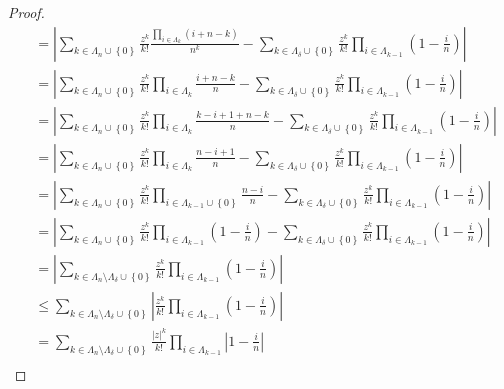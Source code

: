 \documentclass[dvipdfmx]{jsarticle}
\begin{document}
\begin{proof}
\begin{align*}
&= \left| \sum_{k \in \varLambda_{n} \cup \left\{ 0 \right\}} {\frac{z^{k}}{k!}\frac{\prod_{i \in \varLambda_{k}} (i + n - k)}{n^{k}}} - \sum_{k \in \varLambda_{\delta} \cup \left\{ 0 \right\}} {\frac{z^{k}}{k!}\prod_{i \in \varLambda_{k - 1}} \left( 1 - \frac{i}{n} \right)} \right|\\
&= \left| \sum_{k \in \varLambda_{n} \cup \left\{ 0 \right\}} {\frac{z^{k}}{k!}\prod_{i \in \varLambda_{k}} \frac{i + n - k}{n}} - \sum_{k \in \varLambda_{\delta} \cup \left\{ 0 \right\}} {\frac{z^{k}}{k!}\prod_{i \in \varLambda_{k - 1}} \left( 1 - \frac{i}{n} \right)} \right|\\
&= \left| \sum_{k \in \varLambda_{n} \cup \left\{ 0 \right\}} {\frac{z^{k}}{k!}\prod_{i \in \varLambda_{k}} \frac{k - i + 1 + n - k}{n}} - \sum_{k \in \varLambda_{\delta} \cup \left\{ 0 \right\}} {\frac{z^{k}}{k!}\prod_{i \in \varLambda_{k - 1}} \left( 1 - \frac{i}{n} \right)} \right|\\
&= \left| \sum_{k \in \varLambda_{n} \cup \left\{ 0 \right\}} {\frac{z^{k}}{k!}\prod_{i \in \varLambda_{k}} \frac{n - i + 1}{n}} - \sum_{k \in \varLambda_{\delta} \cup \left\{ 0 \right\}} {\frac{z^{k}}{k!}\prod_{i \in \varLambda_{k - 1}} \left( 1 - \frac{i}{n} \right)} \right|\\
&= \left| \sum_{k \in \varLambda_{n} \cup \left\{ 0 \right\}} {\frac{z^{k}}{k!}\prod_{i \in \varLambda_{k - 1} \cup \left\{ 0 \right\}} \frac{n - i}{n}} - \sum_{k \in \varLambda_{\delta} \cup \left\{ 0 \right\}} {\frac{z^{k}}{k!}\prod_{i \in \varLambda_{k - 1}} \left( 1 - \frac{i}{n} \right)} \right|\\
&= \left| \sum_{k \in \varLambda_{n} \cup \left\{ 0 \right\}} {\frac{z^{k}}{k!}\prod_{i \in \varLambda_{k - 1}} \left( 1 - \frac{i}{n} \right)} - \sum_{k \in \varLambda_{\delta} \cup \left\{ 0 \right\}} {\frac{z^{k}}{k!}\prod_{i \in \varLambda_{k - 1}} \left( 1 - \frac{i}{n} \right)} \right|\\
&= \left| \sum_{k \in \varLambda_{n} \setminus \varLambda_{\delta} \cup \left\{ 0 \right\}} {\frac{z^{k}}{k!}\prod_{i \in \varLambda_{k - 1}} \left( 1 - \frac{i}{n} \right)} \right|\\
&\leq \sum_{k \in \varLambda_{n} \setminus \varLambda_{\delta} \cup \left\{ 0 \right\}} \left| \frac{z^{k}}{k!}\prod_{i \in \varLambda_{k - 1}} \left( 1 - \frac{i}{n} \right) \right|\\
&= \sum_{k \in \varLambda_{n} \setminus \varLambda_{\delta} \cup \left\{ 0 \right\}} {\frac{|z|^{k}}{k!}\prod_{i \in \varLambda_{k - 1}} \left| 1 - \frac{i}{n} \right|}\\

\end{align*}
\end{proof}
\end{document}
